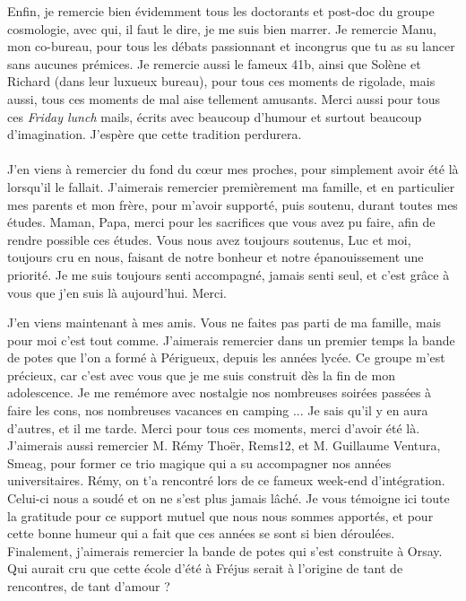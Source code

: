 Enfin, je remercie bien évidemment tous les doctorants et post-doc du groupe cosmologie, avec qui, il faut le dire, je me suis bien marrer. Je remercie Manu, mon co-bureau, pour tous les débats passionnant et incongrus que tu as su lancer sans aucunes prémices. Je remercie aussi le fameux 41b, ainsi que Solène et Richard (dans leur luxueux bureau), pour tous ces moments de rigolade, mais aussi, tous ces moments de mal aise tellement amusants. Merci aussi pour tous ces \emph{Friday lunch} mails, écrits avec beaucoup d'humour et surtout beaucoup d'imagination. J'espère que cette tradition perdurera.

\paragraph{}
J'en viens à remercier du fond du cœur mes proches, pour simplement avoir été là lorsqu'il le fallait.
J'aimerais remercier premièrement ma famille, et en particulier mes parents et mon frère, pour m'avoir supporté, puis soutenu, durant toutes mes études. Maman, Papa, merci pour les sacrifices que vous avez pu faire, afin de rendre possible ces études. Vous nous avez toujours soutenus, Luc et moi, toujours cru en nous, faisant de notre bonheur et notre épanouissement une priorité. Je me suis toujours senti accompagné, jamais senti seul, et c'est grâce à vous que j'en suis là aujourd'hui. Merci.

J'en viens maintenant à mes amis. Vous ne faites pas parti de ma famille, mais pour moi c'est tout comme. J'aimerais remercier dans un premier temps la bande de potes que l'on a formé à Périgueux, depuis les années lycée. Ce groupe m'est précieux, car c'est avec vous que je me suis construit dès la fin de mon adolescence. Je me remémore avec nostalgie nos nombreuses soirées passées à faire les cons, nos nombreuses vacances en camping ... Je sais qu'il y en aura d'autres, et il me tarde. Merci pour tous ces moments, merci d'avoir été là.
J'aimerais aussi remercier M. Rémy Thoër, Rems12, et M. Guillaume Ventura, Smeag, pour former ce trio magique qui a su accompagner nos années universitaires. Rémy, on t'a rencontré lors de ce fameux week-end d'intégration. Celui-ci nous a soudé et on ne s'est plus jamais lâché. Je vous témoigne ici toute la gratitude pour ce support mutuel que nous nous sommes apportés, et pour cette bonne humeur qui a fait que ces années se sont si bien déroulées.
Finalement, j'aimerais remercier la bande de potes qui s'est construite à Orsay. Qui aurait cru que cette école d'été à Fréjus serait à l'origine de tant de rencontres, de tant d'amour ? 
